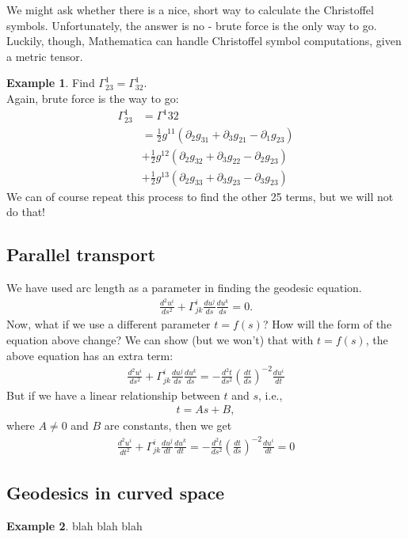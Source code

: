 \documentclass{article}
\theoremstyle{definition}
\newtheorem{exmp}{Example}[section]
\begin{document}
We might ask whether there is a nice, short way to calculate the Christoffel symbols. Unfortunately, the answer is no - brute force is the only way to go. Luckily, though, Mathematica can handle Christoffel symbol computations, given a metric tensor. 
\begin{exmp}
	Find $\Gamma^{1}_{23} = \Gamma^1_{32}$.\\
	
	Again, brute force is the way to go:
	\begin{align*}
	\Gamma^{1}_{23} &= \Gamma^1{32}\\
	&= \frac{1}{2}g^{11}\left( \partial_2 g_{31} + \partial_3 g_{21} - \partial_1 g_{23}\right)\\
	&+ \frac{1}{2}g^{12}\left( \partial_2 g_{32} + \partial_3 g_{22} - \partial_2 g_{23}\right)\\
	&+
	\frac{1}{2}g^{13}\left( \partial_2 g_{33} + \partial_3 g_{23} - \partial_3 g_{23}\right)
	\end{align*}
	We can of course repeat this process to find the other 25 terms, but we will not do that!
\end{exmp}
\subsection{Parallel transport}
We have used arc length as a parameter in finding the geodesic equation. 
\begin{align*}
\frac{d^2u^i}{ds^2} + \Gamma^{i}_{jk}\frac{du^j}{ds}\frac{du^k}{ds} = 0.
\end{align*}
Now, what if we use a different parameter $t = f(s)$? How will the form of the equation above change? We can show (but we won't) that with $t = f(s)$, the above equation has an extra term:
\begin{align*}
\boxed{\frac{d^2u^i}{ds^2} + \Gamma^{i}_{jk}\frac{du^j}{ds}\frac{du^k}{ds} = -\frac{d^2t}{ds^2}\left( \frac{dt}{ds}\right)^{-2}\frac{du^i}{dt}}
\end{align*}
But if we have a linear relationship between $t$ and $s$, i.e.,
\begin{align*}
t = As +B,
\end{align*}
where $A\neq 0$ and $B$ are constants, then we get
\begin{align*}
\boxed{\frac{d^2u^i}{dt^2} + \Gamma^{i}_{jk}\frac{du^j}{dt}\frac{du^k}{dt} = -\frac{d^2t}{ds^2}\left( \frac{dt}{ds}\right)^{-2}\frac{du^i}{dt} = 0}
\end{align*}
\subsection{Geodesics in curved space}
\begin{exmp}
	blah blah blah
\end{exmp}
\end{document}
